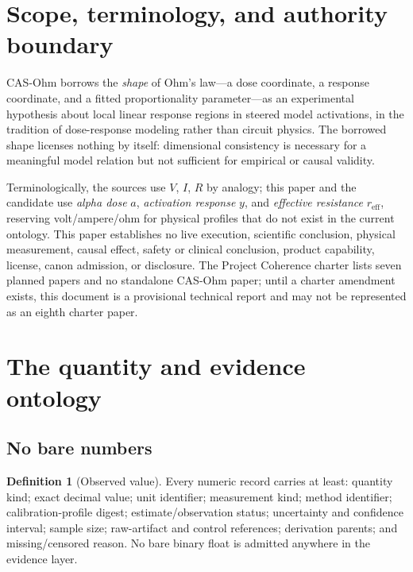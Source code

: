 \documentclass[11pt]{amsart}
\theoremstyle{definition}
\newtheorem{definition}[theorem]{Definition}
\theoremstyle{remark}
\begin{document}
\section{Scope, terminology, and authority boundary}\label{sec:scope}

CAS-Ohm borrows the \emph{shape} of Ohm's law---a dose coordinate, a response coordinate, and a fitted proportionality parameter---as an experimental hypothesis about local linear response regions in steered model activations, in the tradition of dose-response modeling rather than circuit physics. The borrowed shape licenses nothing by itself: dimensional consistency is necessary for a meaningful model relation \cite{buckingham} but not sufficient for empirical or causal validity.

Terminologically, the sources use $V$, $I$, $R$ by analogy; this paper and the candidate use \emph{alpha dose} $a$, \emph{activation response} $y$, and \emph{effective resistance} $r_{\mathrm{eff}}$, reserving volt/ampere/ohm for physical profiles that do not exist in the current ontology. This paper establishes no live execution, scientific conclusion, physical measurement, causal effect, safety or clinical conclusion, product capability, license, canon admission, or disclosure. The Project Coherence charter lists seven planned papers and no standalone CAS-Ohm paper; until a charter amendment exists, this document is a provisional technical report and may not be represented as an eighth charter paper.

\section{The quantity and evidence ontology}\label{sec:ontology}

\subsection{No bare numbers}

\begin{definition}[Observed value]\label{def:observed}
Every numeric record carries at least: quantity kind; exact decimal value; unit identifier; measurement kind; method identifier; calibration-profile digest; estimate/observation status; uncertainty and confidence interval; sample size; raw-artifact and control references; derivation parents; and missing/censored reason. No bare binary float is admitted anywhere in the evidence layer.
\end{definition}
\end{document}
